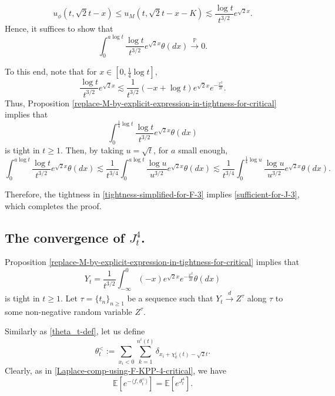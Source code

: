 \documentclass[a4paper,reqno]{amsart}%
\newcommand{\1}{\mathbf 1}
\theoremstyle{mine}
\numberwithin{theorem}{section}
\numberwithin{equation}{section}
\theoremstyle{remark}
\begin{document}
\[ u_\phi(t, \sqrt{2}t -x) \leq u_M(t, \sqrt{2}t - x -K) \lesssim \frac{\log t} {t^{3/2}} e^{\sqrt{2}x}. \]
Hence, it suffices to show that 
\begin{equation} \label{sufficient-for-J-3}
\int_{0}^{a\log t} \frac{\log t} {t^{3/2}} e^{\sqrt{2}x} \theta(dx) \overset{\mathbb{P}}{\to} 0.
\end{equation}

To this end, note that for $x \in [0, \frac{1}{4}\log t ]$,
\[ \frac{\log t} {t^{3/2}} e^{\sqrt{2}x} \lesssim \frac{1}{t^{3/2}}(-x + \log t)e^{\sqrt{2}x} e^{-\frac{x^2}{2t}}.\]
Thus, Proposition \ref{replace-M-by-explicit-expression-in-tightness-for-critical}
implies that 
\begin{equation}\label{tightness-simplified-for-F-3}
    \int_{0}^{\frac{1}{4}\log t } \frac{\log t} {t^{3/2}} e^{\sqrt{2}x} \theta(dx)
\end{equation}
is tight in $t\geq 1$. Then, by taking $u=\sqrt{t}$, for $a$ small enough, 
\begin{equation}
    \int_{0}^{a \log t} \frac{\log t} {t^{3/2}} e^{\sqrt{2}x} \theta(dx) \lesssim \frac{1}{t^{3/4}}\int_{0}^{a \log t} \frac{\log u} {u^{3/2}} e^{\sqrt{2}x} \theta(dx) \lesssim \frac{1}{t^{3/4}}\int_{0}^{\frac{1}{4}\log u} \frac{\log u} {u^{3/2}} e^{\sqrt{2}x} \theta(dx).
\end{equation}

Therefore, the tightness in \eqref{tightness-simplified-for-F-3} implies \eqref{sufficient-for-J-3}, which completes the proof. 

\subsection{The convergence of $J_t^4$.}

Proposition \ref{replace-M-by-explicit-expression-in-tightness-for-critical} implies that 
\[ Y_t = \frac{1}{t^{3/2}}\int_{-\infty}^0(-x)e^{\sqrt{2}x} e^{-\frac{x^2}{2t}} \theta(dx) \]
is tight in $t\geq 1$. Let $\tau = \{t_n\}_{n\geq 1}$ be a sequence such that $Y_t \overset{d}{\to} Z^{\tau}$ along $\tau$ to some non-negative random variable $Z^\tau$. 

Similarly as \eqref{theta_t-def}, let us define 
\begin{equation} \label{theta_t-def-for-negative}
        \theta_{t}^{<}:= \sum\limits_{x_i <0} \sum\limits_{k=1}^{n^i(t)} \delta_{x_i+\chi_k^i(t)-\sqrt{2} t}.
    \end{equation}
Clearly, as in \eqref{Laplace-comp-using-F-KPP-4-critical}, we have 
\begin{equation}\label{laplace-for-negative-part}
    \mathbb{E}[e^{-\langle f,\theta_t^{<}\rangle}] = \mathbb{E}[e^{J_t^4}].
\end{equation}
\end{document}
